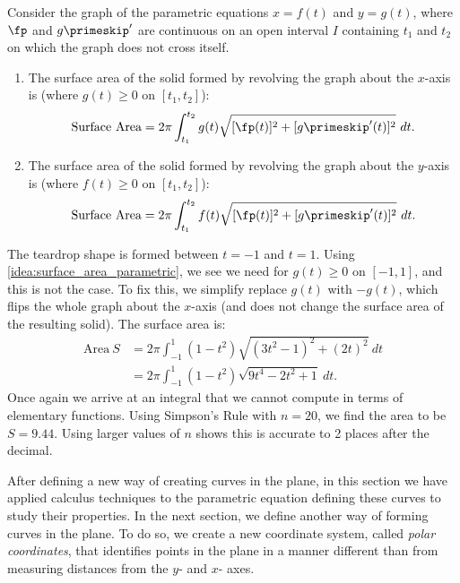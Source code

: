{Consider the graph of the parametric equations $x=f(t)$ and $y=g(t)$, where $\fp$ and $g\primeskip'$ are continuous on an open interval $I$ containing $t_1$ and $t_2$ on which the graph does not cross itself.
\begin{enumerate}
	\item	The surface area of the solid formed by revolving the graph about the $x$-axis is (where $g(t)\geq0$ on $[t_1,t_2]$):
\[
\text{Surface Area}
= 2\pi\int_{t_1}^{t_2} g(t)\sqrt{[\fp(t)]^2+[g\primeskip'(t)]^2}\ dt.
\]
	
	\item	The surface area of the solid formed by revolving the graph about the $y$-axis is (where $f(t)\geq0$ on $[t_1,t_2]$):
\[
\text{Surface Area}
= 2\pi\int_{t_1}^{t_2} f(t)\sqrt{[\fp(t)]^2+[g\primeskip'(t)]^2}\ dt.
\]
	\end{enumerate}}


{The teardrop shape is formed between $t=-1$ and $t=1$. Using \autoref{idea:surface_area_parametric}, we see we need for $g(t)\geq 0$ on $[-1,1]$, and this is not the case. To fix this, we simplify replace $g(t)$ with $-g(t)$, which flips the whole graph about the $x$-axis (and does not change the surface area of the resulting solid). The surface area is: 
\begin{align*}
\text{Area}\ S &= 2\pi\int_{-1}^1 (1-t^2)\sqrt{(3t^2-1)^2+(2t)^2}\ dt\\
		&=	2\pi\int_{-1}^1 (1-t^2)\sqrt{9t^4-2t^2+1} \ dt.
		\end{align*}
Once again we arrive at an integral that we cannot compute in terms of elementary functions. Using Simpson's Rule with $n=20$, we find the area to be $S=9.44$. Using larger values of $n$ shows this is accurate to 2 places after the decimal.}

After defining a new way of creating curves in the plane, in this section we have applied calculus techniques to the parametric equation defining these curves to study their properties. In the next section, we define another way of forming curves in the plane. To do so, we create a new coordinate system, called \emph{polar coordinates}, that identifies points in the plane in a manner different than from measuring distances from the $y$- and $x$- axes.

